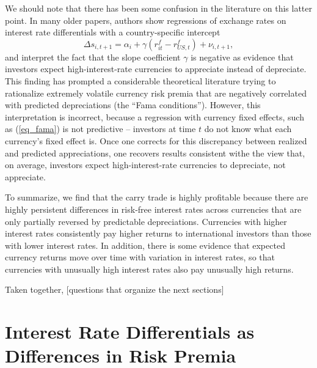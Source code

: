 \documentclass{ar-1col}
\begin{document}
We should note that there has been some confusion in the literature on this latter point. In many older papers, authors show regressions of exchange rates on interest rate differentials with a country-specific intercept \begin{equation}\label{eq_fama}
\Delta s_{i,t+1}=\alpha_i+\gamma\left( r^f_{it}-{r}^f_{US,t}\right) +\nu
_{i,t+1},  
\end{equation}
and interpret the fact that the slope coefficient $\gamma$ is negative as evidence that investors expect high-interest-rate currencies to appreciate instead of depreciate. This finding has prompted a considerable theoretical literature trying to rationalize extremely volatile currency risk premia that are negatively correlated with predicted depreciations (the ``Fama conditions''). However, this interpretation is incorrect, because a regression with currency fixed effects, such as (\ref{eq_fama}) is not predictive -- investors at time $t$ do not know what each currency's fixed effect is. Once one corrects for this discrepancy between realized and predicted appreciations, one recovers results consistent withe the view that, on average, investors expect high-interest-rate currencies to depreciate, not appreciate. 

To summarize, we find that the carry trade is highly profitable because there are highly persistent differences in risk-free interest rates across currencies that are only partially reversed by predictable depreciations. Currencies with higher interest rates consistently pay higher returns to international investors than those with lower interest rates. In addition, there is some evidence that expected currency returns move over time with variation in interest rates, so that currencies with unusually high interest rates also pay unusually high  returns.

Taken together, [questions that organize the next sections]







\section{Interest Rate Differentials as Differences in Risk Premia}
\end{document}
